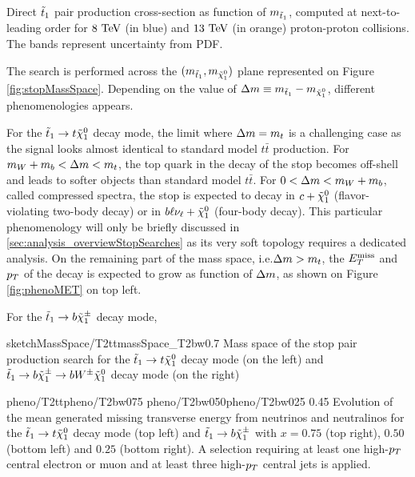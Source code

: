         {Direct $\tilde{t}_1$ pair production cross-section as function of $m_{\tilde{t}_1}$, computed at next-to-leading order
        for $8~\text{TeV}$ (in blue) and $13~\text{TeV}$ (in orange) proton-proton collisions. The bands represent uncertainty from PDF.}

        The search is performed across the $(m_{\tilde{t}_1},m_{\tilde{\chi}_1^0})$ plane
        represented on Figure \ref{fig:stopMassSpace}. Depending on the value of
        $\Delta m \equiv m_{\tilde{t}_1} - m_{\tilde{\chi}_1^0}$, different phenomenologies
        appears.

        For the $\tilde{t}_1 \rightarrow t \tilde{\chi}_1^0$ decay mode, the limit where
        $\Delta m = m_{t}$ is a challenging case as the signal looks almost identical
        to standard model $t\bar{t}$ production. For $m_{W} + m_{b} < \Delta m < m_{t}$,
        the top quark in the decay of the stop becomes off-shell and leads to softer objects
        than standard model $t\bar{t}$. For $0 < \Delta m < m_{W} + m_{b}$, called
        compressed spectra, the stop is expected to decay in $c+\tilde{\chi}_1^0$
        (flavor-violating two-body decay) or in $b\ell\nu_\ell+\tilde{\chi}_1^0$ (four-body
        decay). This particular phenomenology will only be briefly discussed in
        \ref{sec:analysis_overviewStopSearches} as its very soft topology requires a
        dedicated analysis. On the remaining part of the mass space, i.e.$\Delta m > m_{t}$,
        the $E_T^\text{miss}$ and $p_T$ of the decay is expected to grow as function of $\Delta m$,
        as shown on Figure \ref{fig:phenoMET} on top left.

        For the $\tilde{t}_1 \rightarrow b \tilde{\chi}_1^\pm$ decay mode, 

                     {sketchMassSpace/T2tt}{massSpace_T2bw}{0.7}
                     {Mass space of the stop pair production search for the $\tilde{t}_1
                     \rightarrow t \tilde{\chi}_1^0$ decay mode (on the left) and $\tilde{t}_1
                     \rightarrow b \tilde{\chi}_1^\pm \rightarrow b W^{\pm} \tilde{\chi}_1^0 $ decay
                     mode (on the right) }

                     {pheno/T2tt}{pheno/T2bw075}
                     {pheno/T2bw050}{pheno/T2bw025}
                     {0.45}
                     {Evolution of the mean generated missing transverse energy from neutrinos
                     and neutralinos for the $\tilde{t}_1 \rightarrow t \tilde{\chi}_1^0$
                     decay mode (top left) and $\tilde{t}_1 \rightarrow b \tilde{\chi}_1^\pm$ with
                     $x = 0.75$ (top right), $0.50$ (bottom left) and $0.25$ (bottom right).
                     A selection requiring at least one high-$p_T$ central
                     electron or muon and at least three high-$p_T$ central jets is applied.}

